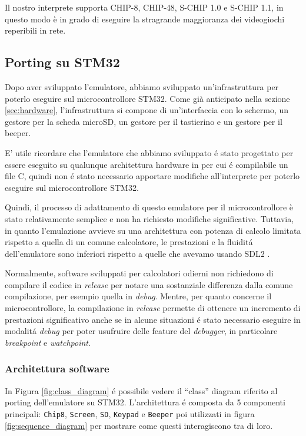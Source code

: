 \documentclass[a4paper]{article}
\begin{document}
Il nostro interprete supporta CHIP-8, CHIP-48, S-CHIP 1.0 e
S-CHIP 1.1, in questo modo è in grado di eseguire la stragrande
maggioranza dei videogiochi reperibili in rete.

\subsection{Porting su STM32}

Dopo aver sviluppato l'emulatore, abbiamo sviluppato un'infrastruttura per poterlo eseguire sul microcontrollore STM32.
Come già anticipato nella sezione \ref{sec:hardware}, l'infrastruttura si compone di un'interfaccia con lo schermo, un gestore per la scheda microSD, un gestore per il tastierino e un gestore per il beeper.

E' utile ricordare che l'emulatore che abbiamo sviluppato é stato progettato per essere eseguito su qualunque architettura hardware in per cui é compilabile un file C, quindi non é stato necessario apportare modifiche all'interprete per poterlo eseguire sul microcontrollore STM32.

Quindi, il processo di adattamento di questo emulatore per il microcontrollore è stato relativamente semplice e non ha richiesto modifiche significative. Tuttavia, in quanto l'emulazione avvieve su una architettura con potenza di calcolo limitata rispetto a quella di un comune calcolatore, le prestazioni e la fluiditá dell'emulatore sono inferiori rispetto a quelle che avevamo usando SDL2 \cite{libsdl:about}.

Normalmente, software sviluppati per calcolatori odierni non richiedono di compilare il codice in \textit{release} per notare una sostanziale differenza dalla comune compilazione, per esempio quella in \textit{debug}. Mentre, per quanto concerne il microcontrollore, la compilazione in \textit{release} permette di ottenere un incremento di prestazioni significativo anche se in alcune situazioni \'e stato necessario eseguire in modalit\'a \textit{debug} per poter usufruire delle feature del \textit{debugger}, in particolare \textit{breakpoint} e \textit{watchpoint}.

\subsubsection{Architettura software}

In Figura \ref{fig:class_diagram} é possibile vedere il ``class'' diagram riferito al porting dell'emulatore su STM32. L'architettura é composta da 5 componenti principali: \texttt{Chip8}, \texttt{Screen}, \texttt{SD}, \texttt{Keypad} e \texttt{Beeper} poi utilizzati in figura \ref{fig:sequence_diagram} per mostrare come questi interagiscono tra di loro.
\end{document}
